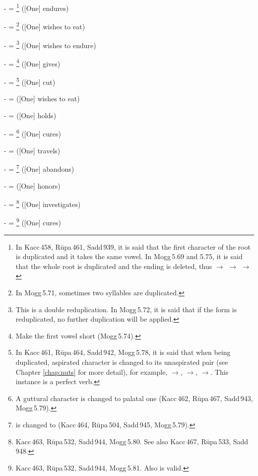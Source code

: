 -  = \footnote{In Kacc\,458, R\=upa\,461, Sadd\,939, it is said that the first character of the root is duplicated and it takes the same vowel. In Mogg\,5.69 and 5.75, it is said that the whole root is duplicated and the ending is deleted, thus  $\rightarrow$  $\rightarrow$  $\rightarrow$ } ([One] endures)\par
-  = \footnote{In Mogg\,5.71, sometimes two syllables are duplicated.} ([One] wishes to eat)\par
-  = \footnote{This is a double reduplication. In Mogg\,5.72, it is said that if the form is reduplicated, no further duplication will be applied.} ([One] wishes to endure)\par
-  = \footnote{Make the first vowel short (Mogg\,5.74).} ([One] gives)\par
-  = \footnote{In Kacc\,461, R\=upa\,464, Sadd\,942, Mogg\,5.78, it is said that when being duplicated, aspirated character is changed to its unaspirated pair (see Chapter \ref{chap:nuts} for more detail), for example, $\rightarrow$, $\rightarrow$, $\rightarrow$. This instance is a perfect verb.} ([One] cut)\par
-  =  ([One] wishes to eat)\par
-  =  ([One] holds)\par
-  = \footnote{A guttural character is changed to palatal one (Kacc\,462, R\=upa\,467, Sadd\,943, Mogg\,5.79).} ([One] cures)\par
-  =  ([One] travels)\par
-  = \footnote{ is changed to  (Kacc\,464, R\=upa\,504, Sadd\,945, Mogg\,5.79).} ([One] abandons)\par
-  =  ([One] honors)\par
-  = \footnote{Kacc\,463, R\=upa\,532, Sadd\,944, Mogg\,5.80. See also Kacc\,467, R\=upa\,533, Sadd\,948.} ([One] investigates)\par
-  = \footnote{Kacc\,463, R\=upa\,532, Sadd\,944, Mogg\,5.81. Also  is valid.} ([One] cures)\par
